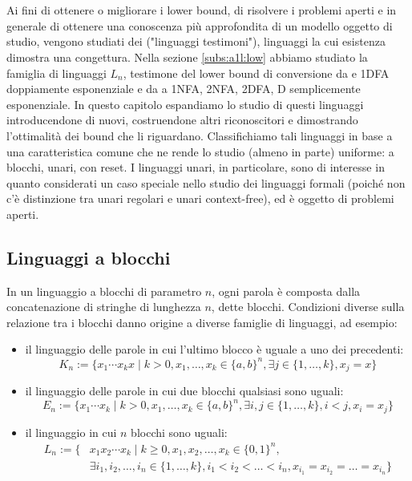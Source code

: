 \chapter{}
Ai fini di ottenere o migliorare i lower bound, di risolvere i problemi aperti e in generale di ottenere una conoscenza più approfondita di un modello oggetto di studio, vengono studiati dei  ("linguaggi testimoni"), linguaggi la cui esistenza dimostra una congettura. Nella sezione \ref{subs:a1l:low} abbiamo studiato la famiglia di linguaggi $L_n$, testimone del lower bound di conversione da  e 1DFA doppiamente esponenziale e da  a 1NFA, 2NFA, 2DFA, D semplicemente esponenziale. In questo capitolo espandiamo lo studio di questi linguaggi introducendone di nuovi, costruendone altri riconoscitori e dimostrando l'ottimalità dei bound che li riguardano. Classifichiamo tali linguaggi in base a una caratteristica comune che ne rende lo studio (almeno in parte) uniforme: a blocchi, unari, con reset. I linguaggi unari, in particolare, sono di interesse in quanto considerati un caso speciale nello studio dei linguaggi formali (poiché non c'è distinzione tra unari regolari e unari context-free), ed è oggetto di problemi aperti.



\section{Linguaggi a blocchi}\label{sec:wit:blk}
In un linguaggio a blocchi di parametro $n$, ogni parola è composta dalla concatenazione di stringhe di lunghezza $n$, dette blocchi. Condizioni diverse sulla relazione tra i blocchi danno origine a diverse famiglie di linguaggi, ad esempio:
\begin{itemize}
	\item il linguaggio delle parole in cui l'ultimo blocco è uguale a uno dei precedenti:
	      \begin{equation*}
		      K_n := \{ x_1\cdots x_kx \mid k>0, x_1,\dots,x_k\in\{a,b\}^n, \exists j\in\{1,\dots,k\},x_j=x\}
	      \end{equation*}
	\item il linguaggio delle parole in cui due blocchi qualsiasi sono uguali:
	      \begin{equation*}
		      E_n := \{x_1\cdots x_k \mid k>0, x_1,\dots,x_k\in\{a,b\}^n,\exists i,j\in\{1,\dots,k\},i<j,x_i=x_j\}
	      \end{equation*}
	\item il linguaggio in cui $n$ blocchi sono uguali:
	      \begin{align*}
		      L_n := \{ & x_1x_2\cdots x_k\mid k\geq0, x_1,x_2,\dots,x_k\in\{0,1\}^n,                                  \\
		                & \exists i_1,i_2,\dots,i_n\in\{1,\dots,k\},i_1<i_2<\dots<i_n, x_{i_1}=x_{i_2}=\dots=x_{i_n}\}
	      \end{align*}
\end{itemize}

